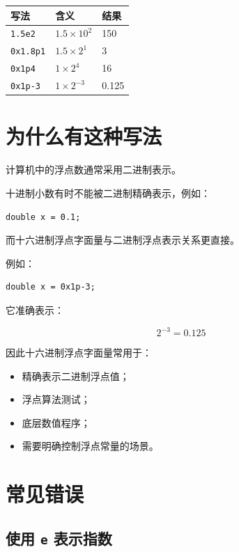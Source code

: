\documentclass[UTF8,12pt,a4paper]{ctexart}
\begin{document}
\begin{center}
\begin{tabular}{lll}
\toprule
写法 & 含义 & 结果 \\
\midrule
\texttt{1.5e2} & \(1.5 \times 10^2\) & 150 \\
\texttt{0x1.8p1} & \(1.5 \times 2^1\) & 3 \\
\texttt{0x1p4} & \(1 \times 2^4\) & 16 \\
\texttt{0x1p-3} & \(1 \times 2^{-3}\) & 0.125 \\
\bottomrule
\end{tabular}
\end{center}

\section{为什么有这种写法}

计算机中的浮点数通常采用二进制表示。

十进制小数有时不能被二进制精确表示，例如：

\begin{lstlisting}
double x = 0.1;
\end{lstlisting}

而十六进制浮点字面量与二进制浮点表示关系更直接。

例如：

\begin{lstlisting}
double x = 0x1p-3;
\end{lstlisting}

它准确表示：

\[
2^{-3} = 0.125
\]

因此十六进制浮点字面量常用于：

\begin{itemize}
    \item 精确表示二进制浮点值；
    \item 浮点算法测试；
    \item 底层数值程序；
    \item 需要明确控制浮点常量的场景。
\end{itemize}

\section{常见错误}

\subsection{使用 \texttt{e} 表示指数}
\end{document}
